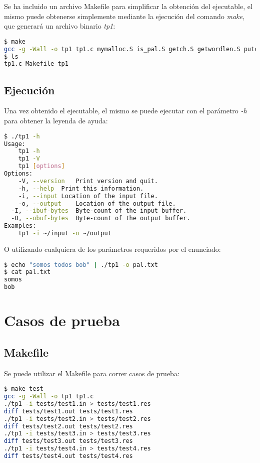 \documentclass[10pt,a4paper]{article}
\begin{document}
\lstset{
	breaklines=true,
  	basicstyle=\footnotesize,
}

Se ha incluido un archivo Makefile para simplificar la obtención del ejecutable, el mismo puede obtenerse simplemente mediante la ejecución del comando \textit{make}, que generará un archivo binario \textit{tp1}:

\begin{lstlisting}[language=bash]
$ make
gcc -g -Wall -o tp1 tp1.c mymalloc.S is_pal.S getch.S getwordlen.S putch.S palindrome.S strcopy.S clear_buf.S
$ ls
tp1.c Makefile tp1 
\end{lstlisting}

\subsection{Ejecución}

Una vez obtenido el ejecutable, el mismo se puede ejecutar con el parámetro \textit{-h} para obtener la leyenda de ayuda:

\begin{lstlisting}[language=bash]
$ ./tp1 -h
Usage:
	tp1 -h
	tp1 -V
	tp1 [options]
Options:
	-V, --version	Print version and quit.
	-h, --help	Print this information.
	-i, --input	Location of the input file.
	-o, --output	Location of the output file.
  -I, --ibuf-bytes  Byte-count of the input buffer.
  -O, --obuf-bytes  Byte-count of the output buffer.
Examples:
	tp1 -i ~/input -o ~/output

\end{lstlisting}

O utilizando cualquiera de los parámetros requeridos por el enunciado:

\begin{lstlisting}[language=bash]
$ echo "somos todos bob" | ./tp1 -o pal.txt
$ cat pal.txt
somos
bob
\end{lstlisting}

\newpage

\section{Casos de prueba}

\subsection{Makefile}

Se puede utilizar el Makefile para correr casos de prueba:

\begin{lstlisting}[language=bash]
$ make test
gcc -g -Wall -o tp1 tp1.c 
./tp1 -i tests/test1.in > tests/test1.res
diff tests/test1.out tests/test1.res
./tp1 -i tests/test2.in > tests/test2.res
diff tests/test2.out tests/test2.res
./tp1 -i tests/test3.in > tests/test3.res
diff tests/test3.out tests/test3.res
./tp1 -i tests/test4.in > tests/test4.res
diff tests/test4.out tests/test4.res
\end{lstlisting}
\end{document}
